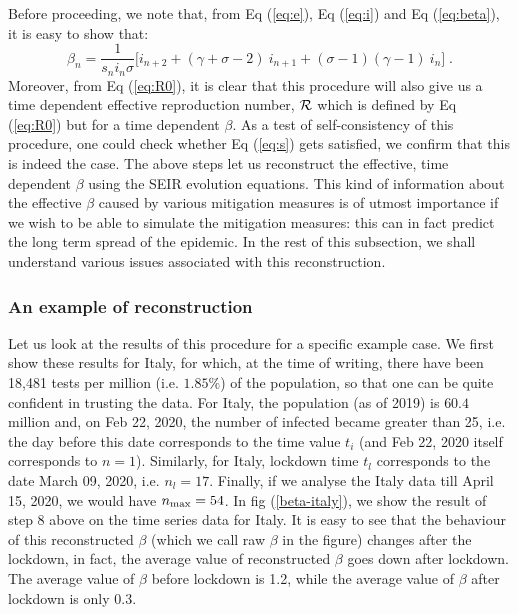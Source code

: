 \documentclass[aps,prd,10pt,twocolumn,nofootinbib]{revtex4-2}
\begin{document}
Before proceeding, we note that, from Eq (\ref{eq:e}), Eq (\ref{eq:i}) and Eq (\ref{eq:beta}), it is easy to show that:
\begin{equation} \label{eq:beta_full}
 \beta_n = \frac{1}{s_n i_n \sigma} \bigg[ i_{n+2} + (\gamma + \sigma - 2)~i_{n+1} + (\sigma - 1) (\gamma - 1)~i_n \bigg] \; .
\end{equation}
Moreover, from Eq (\ref{eq:R0}), it is clear that this procedure will also give us a time dependent effective reproduction number, ${\cal R}$ which is defined by Eq (\ref{eq:R0}) but for a time dependent $\beta$.
As a test of self-consistency of this procedure, one could check whether Eq (\ref{eq:s}) gets satisfied, we confirm that this is indeed the case.
The above steps let us reconstruct the effective, time dependent $\beta$ using the SEIR evolution equations. This kind of information about the effective $\beta$ caused by various mitigation measures is of utmost importance if we wish to be able to simulate the mitigation measures: this can in fact predict the long term spread of the epidemic. In the rest of this subsection, we shall understand various issues associated with this reconstruction.

\subsubsection{An example of reconstruction}

Let us look at the results of this procedure for a specific example case. We first show these results for Italy, for which, at the time of writing, there have been 18,481 tests per million (i.e. $1.85 \%$) of the population, so that one can be quite confident in trusting the data. For Italy, the population (as of 2019) is $60.4$ million and, on Feb 22, 2020, the number of infected became greater than 25, i.e. the day before this date corresponds to the time value $t_i$ (and Feb 22, 2020 itself corresponds to $n=1$). Similarly, for Italy, lockdown time $t_l$ corresponds to the date March 09, 2020, i.e. $n_l = 17$. Finally, if we analyse the Italy data till April 15, 2020, we would have $n_{\rm max} = 54$.
%
In fig (\ref{beta-italy}), we show the result of step 8 above on the time series data for Italy. 
It is easy to see that the behaviour of this reconstructed $\beta$ (which we call raw $\beta$ in the figure) changes after the lockdown, in fact, the average value of reconstructed $\beta$ goes down after lockdown. The average value of $\beta$ before lockdown is 1.2, while the average value of $\beta$ after lockdown is only 0.3.
\end{document}
